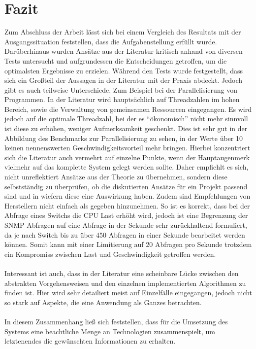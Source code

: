 \chapter{Fazit}
\label{cha:Fazit}

Zum Abschluss der Arbeit lässt sich bei einem Vergleich des Resultats mit der Ausgangssituation feststellen, dass die Aufgabenstellung erfüllt wurde.
Darüberhinaus wurden Ansätze aus der Literatur kritisch anhand von diversen Tests untersucht und aufgrundessen die Entscheidungen getroffen, um die optimalsten Ergebnisse zu erzielen.
Während den Tests wurde festgestellt, dass sich ein Großteil der Aussagen in der Literatur mit der Praxis abdeckt. Jedoch gibt es auch teilweise Unterschiede.
Zum Beispiel bei der Parallelisierung von Programmen. In der Literatur wird hauptsächlich auf Threadzahlen im hohen Bereich, sowie die Verwaltung von gemeinsamen Ressourcen eingegangen.
Es wird jedoch auf die optimale Threadzahl, bei der es “ökonomisch” nicht mehr sinnvoll ist diese zu erhöhen, weniger Aufmerksamkeit geschenkt.
Dies ist sehr gut in der Abbildung des Benchmarks zur Parallelisierung zu sehen, in der Werte über 10 keinen nennenswerten Geschwindigkeitsvorteil mehr bringen.
Hierbei konzentriert sich die Literatur auch vermehrt auf einzelne Punkte, wenn der Hauptaugenmerk vielmehr auf das komplette System gelegt werden sollte.
Daher empfiehlt es sich, nicht unreflektiert Ansätze aus der Theorie zu übernehmen, sondern diese selbstständig zu überprüfen, ob die diskutierten Ansätze für ein Projekt passend sind und in wiefern diese eine Auswirkung haben.
Zudem sind Empfehlungen von Herstellern nicht einfach als gegeben hinzunehmen.
So ist es korrekt, dass bei der Abfrage eines Switchs die CPU Last erhöht wird, jedoch ist eine Begrenzung der SNMP Abfragen auf eine Abfrage in der Sekunde sehr zurückhaltend formuliert, da je nach Switch bis zu über 450 Abfragen in einer Sekunde bearbeitet werden können. Somit kann mit einer Limitierung auf 20 Abfragen pro Sekunde trotzdem ein Kompromiss zwischen Last und Geschwindigkeit getroffen werden.\\\\
Interessant ist auch, dass in der Literatur eine scheinbare Lücke zwischen den abstrakten Vorgehensweisen und den einzelnen implementierten Algorithmen zu finden ist.
Hier wird sehr detailiert meist auf Einzelfälle eingegangen, jedoch nicht so stark auf Aspekte, die eine Anwendung als Ganzes betrachten.\\\\
In diesem Zusammenhang ließ sich feststellen, dass für die Umsetzung des Systems eine beachtliche Menge an Technologien zusammenspielt, um letztenendes die gewünschten Informationen zu erhalten.
